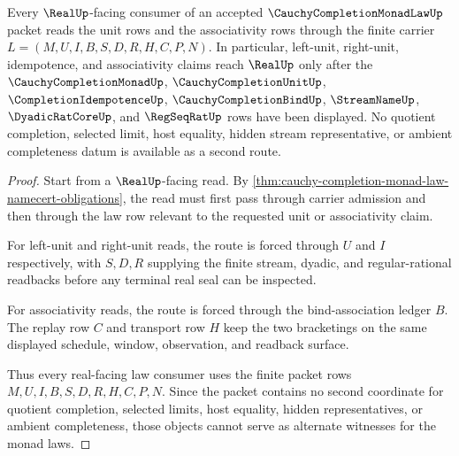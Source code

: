 \begin{theorem}
\label{thm:cauchy-completion-monad-law-unit-associativity-boundary}
Every $\RealUp$-facing consumer of an accepted $\CauchyCompletionMonadLawUp$ packet reads the unit rows and the associativity rows through the finite carrier $L=(M,U,I,B,S,D,R,H,C,P,N)$. In particular, left-unit, right-unit, idempotence, and associativity claims reach $\RealUp$ only after the $\CauchyCompletionMonadUp$, $\CauchyCompletionUnitUp$, $\CompletionIdempotenceUp$, $\CauchyCompletionBindUp$, $\StreamNameUp$, $\DyadicRatCoreUp$, and $\RegSeqRatUp$ rows have been displayed. No quotient completion, selected limit, host equality, hidden stream representative, or ambient completeness datum is available as a second route.
\end{theorem}
\begin{proof}
Start from a $\RealUp$-facing read. By \autoref{thm:cauchy-completion-monad-law-namecert-obligations}, the read must first pass through carrier admission and then through the law row relevant to the requested unit or associativity claim.

For left-unit and right-unit reads, the route is forced through $U$ and $I$ respectively, with $S,D,R$ supplying the finite stream, dyadic, and regular-rational readbacks before any terminal real seal can be inspected.

For associativity reads, the route is forced through the bind-association ledger $B$. The replay row $C$ and transport row $H$ keep the two bracketings on the same displayed schedule, window, observation, and readback surface.

Thus every real-facing law consumer uses the finite packet rows $M,U,I,B,S,D,R,H,C,P,N$. Since the packet contains no second coordinate for quotient completion, selected limits, host equality, hidden representatives, or ambient completeness, those objects cannot serve as alternate witnesses for the monad laws.
\end{proof}

